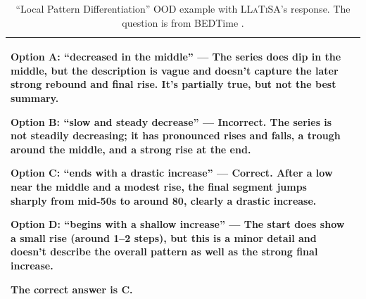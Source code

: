 \documentclass[11pt]{article}
\begin{document}
\begin{table}[t]
\begin{tabularx}{\textwidth}{@{}>{\bfseries}p{1.8cm}X@{}}
{Option A: ``decreased in the middle'' — The series does dip in the middle, but the description is vague and doesn’t capture the later strong rebound and final rise. It’s partially true, but not the best summary.

Option B: ``slow and steady decrease'' — Incorrect. The series is not steadily decreasing; it has pronounced rises and falls, a trough around the middle, and a strong rise at the end.

Option C: ``ends with a drastic increase'' — Correct. After a low near the middle and a modest rise, the final segment jumps sharply from mid-50s to around 80, clearly a drastic increase.

Option D: ``begins with a shallow increase'' — The start does show a small rise (around 1–2 steps), but this is a minor detail and doesn’t describe the overall pattern as well as the strong final increase.

The correct answer is C.}\\
\bottomrule
\end{tabularx}
\caption{``Local Pattern Differentiation'' OOD example with \textsc{LLaTiSA}'s response. The question is from BEDTime \cite{bedtime}.}
\label{tab:llatisa_l2_local}
\end{table}
\end{document}
